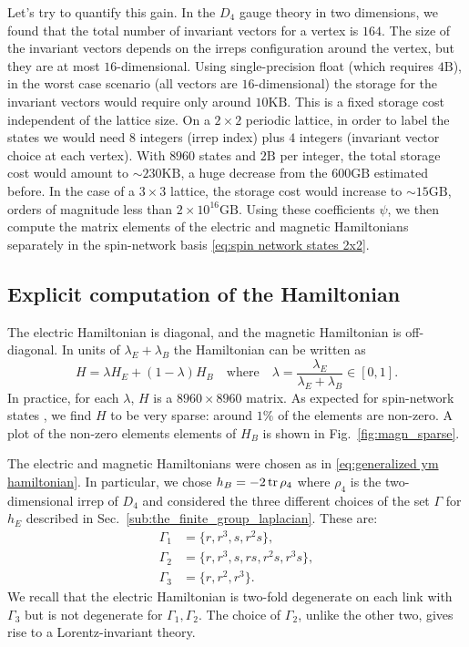 Let's try to quantify this gain.
In the $D_4$ gauge theory in two dimensions, we found that the total number of invariant vectors for a vertex is $164$.
The size of the invariant vectors depends on the \acp{irrep} configuration around the vertex, but they are at most $16$-dimensional.
Using single-precision float (which requires $4 \mathrm{B}$), in the worst case scenario (all vectors are $16$-dimensional) the storage for the invariant vectors would require only around $10 \mathrm{KB}$.
This is a fixed storage cost independent of the lattice size.
On a $2 \times 2$ periodic lattice, in order to label the states we would need $8$ integers (\ac{irrep} index) plus $4$ integers (invariant vector choice at each vertex).
With $8960$ states and $2 \mathrm{B}$ per integer, the total storage cost would amount to $\sim \! 230 \mathrm{KB}$, a huge decrease from the $600 \mathrm{GB}$ estimated before.
In the case of a $3 \times 3$ lattice, the storage cost would increase to $\sim \! 15 \mathrm{GB}$, orders of magnitude less than $2 \times 10^{16} \mathrm{GB}$.
Using these coefficients $\psi$, we then compute the matrix elements of the electric and magnetic Hamiltonians separately in the spin-network basis \eqref{eq:spin network states 2x2}.


\subsection{Explicit computation of the Hamiltonian}
\label{sub:explicit_computation_of_the_hamiltonian}

The electric Hamiltonian is diagonal, and the magnetic Hamiltonian is off-diagonal.
In units of $\lambda_E + \lambda_B$ the Hamiltonian can be written as
\begin{equation}
    H = \lambda H_E + (1-\lambda) H_B
    \quad \text{where} \quad
    \lambda = \frac{\lambda_E}{\lambda_E + \lambda_B} \in [0, 1].
\end{equation}
In practice, for each $\lambda$, $H$ is a $8960 \times 8960$ matrix.
As expected for spin-network states \cite{burgio2000physical}, we find $H$ to be very sparse: around $1\%$ of the elements are non-zero.
A plot of the non-zero elements elements of $H_B$ is shown in Fig.~\ref{fig:magn_sparse}.

The electric and magnetic Hamiltonians were chosen as in \eqref{eq:generalized ym hamiltonian}.
In particular, we chose $h_B = -2 \tr \rho_4$ where $\rho_4$ is the two-dimensional irrep of $D_4$ and considered the three different choices of the set $\Gamma$ for $h_E$ described in Sec.~\ref{sub:the_finite_group_laplacian}.
These are:
\begin{equation*}
    \begin{split}
        \Gamma_1 & = \{r,r^3,s,r^2s\}, \\
        \Gamma_2 & = \{r, r^3, s, rs, r^2s, r^3s\}, \\
        \Gamma_3 & = \{r, r^2, r^3\}.
    \end{split}
\end{equation*}
We recall that the electric Hamiltonian is two-fold degenerate on each link with $\Gamma_3$ but is not degenerate for $\Gamma_1, \Gamma_2$.
The choice of $\Gamma_2$, unlike the other two, gives rise to a Lorentz-invariant theory.

